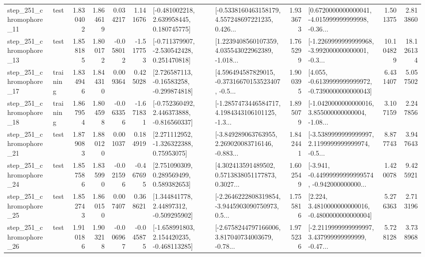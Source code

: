 \begin{tabular}{llrrrrllrlrr}
  step\_251\_chromophore\_11 &      test &      1.830402 &    1.864619 &      0.034217 &  1.141676 &    [-0.481002218, 2.639958445, 0.180745775] &  [-0.5338160463158179, 4.557248697221235, 0.426... &       1.933673 &  [0.6720000000000041, -4.015999999999998, -0.36... &            1.501375 &          2.813860 \\
  step\_251\_chromophore\_13 &      test &      1.858185 &    1.800172 &     -0.058012 & -1.517753 &   [-0.711379907, -2.530542428, 0.251470818] &  [1.2239408560107359, 4.035543022962389, -1.018... &       1.765299 &  [-1.2269999999999968, -3.992000000000001, -0.3... &           10.104829 &         18.126134 \\
  step\_251\_chromophore\_17 &  training &      1.834946 &    1.844310 &      0.009364 &  0.425028 &    [2.726587113, -0.16583258, -0.299874818] &  [4.596494587829015, -0.37316670153523407, -0.5... &       1.900395 &  [4.055, -0.6139999999999972, -0.7390000000000043] &            6.431407 &          5.057502 \\
  step\_251\_chromophore\_18 &  training &      1.867954 &    1.804598 &     -0.063356 & -1.671831 &   [-0.752360492, 2.446373888, -0.816560337] &  [-1.2857473446584717, 4.1984343106101125, -1.3... &       1.895079 &  [-1.0420000000000016, 3.855000000000004, -1.08... &            3.107159 &          2.247856 \\
  step\_251\_chromophore\_21 &      test &      1.879083 &    1.880120 &      0.001037 &  0.184919 &     [2.271112952, -1.326322388, 0.75953075] &  [-3.849289063763955, 2.269020083716146, -0.883... &       1.842441 &  [-3.5389999999999997, 2.1199999999999974, -0.5... &            8.877743 &          3.947643 \\
  step\_251\_chromophore\_24 &      test &      1.857586 &    1.835990 &     -0.021596 & -0.467695 &     [2.751090309, 0.289569499, 0.589382653] &  [4.302413591489502, 0.5713838051177873, 0.3027... &       1.602549 &  [-3.941, -0.44999999999999574, -0.942000000000... &            1.420078 &          9.425921 \\
  step\_251\_chromophore\_25 &      test &      1.852743 &    1.860150 &      0.007407 &  0.368621 &     [1.344841778, 2.44897312, -0.509295902] &  [-2.2646222808319854, -3.9445903090750973, 0.5... &       1.755816 &   [2.224, 3.4810000000000016, -0.4800000000000004] &            5.276363 &          2.713196 \\
  step\_251\_chromophore\_26 &      test &      1.910186 &    1.903218 &     -0.006967 & -0.045875 &   [-1.658991803, 2.154420235, -0.468113285] &  [-2.6758244797166006, 3.817040734003679, -0.78... &       1.975236 &  [-2.2119999999999997, 3.437999999999999, -0.47... &            5.728128 &          3.738968 \\

\end{tabular}
